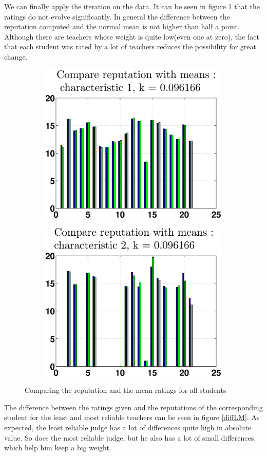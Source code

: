 \documentclass[12pt,a4paper]{article}
\begin{document}
We can finally apply the iteration on the data. It can be seen in figure \ref{compRM} that the ratings do not evolve significantly. In general the difference between the reputation computed and the normal mean is not higher than half a point.\\
Although there are teachers whose weight is quite low(even one at zero), the fact that each student was rated by a lot of teachers reduces the possibility for great change.
\begin{figure}[!h]
\centering
\begin{subfigure}[b]{\textwidth}
\includegraphics[width = 12cm]{preprocessSelect/ppscompareRepc1K3fb89e54e9211a25.eps}
\end{subfigure}
\begin{subfigure}[b]{\textwidth}
\includegraphics[width = 12cm]{preprocessSelect/ppscompareRepc2K3fb89e54e9211a25.eps}
\end{subfigure}
\caption{\label{compRM}Comparing the reputation and the mean ratings for all students}
\end{figure}
The difference between the ratings given and the reputations of the corresponding student for the least and most reliable teachers can be seen in figure \ref{diffLM}. As expected, the least reliable judge has a lot of differences quite high in absolute value. So does the most reliable judge, but he also has a lot of small differences, which help him keep a big weight.
\end{document}

